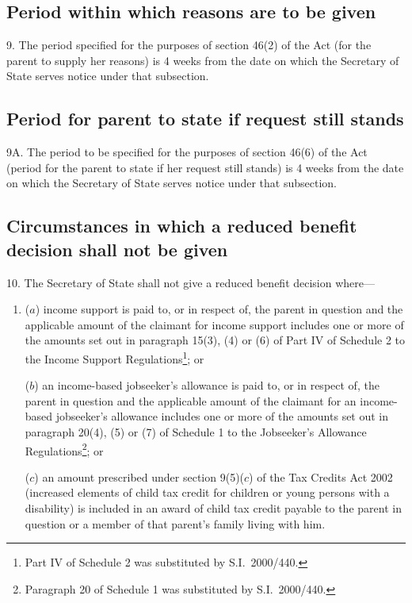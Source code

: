 \documentclass[12pt,a4paper]{article}
\begin{document}
\subsection[9. Period within which reasons are to be given]{Period within which reasons are to be given}

9.  The period specified for the purposes of section 46(2) of the Act (for the parent to supply her reasons) is 4 weeks from the date on which the Secretary of State serves notice under that subsection.

\subsection[9A. Period for parent to state if request still stands]{Period for parent to state if request still stands}

9A.  The period to be specified for the purposes of section 46(6) of the Act (period for the parent to state if her request still stands) is 4 weeks from the date on which the Secretary of State serves notice under that subsection.


\subsection[10. Circumstances in which a reduced benefit decision shall not be given]{Circumstances in which a reduced benefit decision shall not be given}

10.  The Secretary of State shall not give a reduced benefit decision where—
\begin{enumerate}\item[]
($a$) income support is paid to, or in respect of, the parent in question and the applicable amount of the claimant for income support includes one or more of the amounts set out in paragraph 15(3), (4) or (6) of Part IV of Schedule 2 to the Income Support Regulations\footnote{Part IV of Schedule 2 was substituted by S.I.\ 2000/440.}; or

($b$) an income-based jobseeker’s allowance is paid to, or in respect of, the parent in question and the applicable amount of the claimant for an income-based jobseeker’s allowance includes one or more of the amounts set out in paragraph 20(4), (5) or (7) of Schedule 1 to the Jobseeker’s Allowance Regulations\footnote{Paragraph 20 of Schedule 1 was substituted by S.I.\ 2000/440.};
%
or

    ($c$) 
    an amount prescribed under section 9(5)($c$)  of the Tax Credits Act 2002 (increased elements of child tax credit for children or young persons with a disability) is included in an award of child tax credit payable to the parent in question or a member of that parent’s family living with him.
\end{enumerate}
\end{document}
